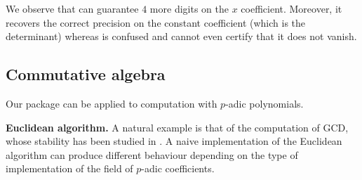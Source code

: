 \documentclass[sigconf]{acmart}
\newcommand{\ZpCR}{\text{\color{output} \rm \tt ZpCR}\xspace}
\newcommand{\ZpLC}{\text{\color{output} \rm \tt ZpLC}\xspace}
\theoremstyle{definition}
\begin{document}
\smallskip

\noindent
We observe that \ZpLC can guarantee $4$ more digits on the $x$ 
coefficient. Moreover, it recovers the correct precision on the
constant coefficient (which is the determinant) whereas \ZpCR is 
confused and cannot even certify that it does not vanish.

\subsection{Commutative algebra}

Our package can be applied to computation with $p$-adic polynomials. 

\medskip

\noindent \textbf{Euclidean algorithm.}
%
A natural example is that of the computation of GCD, whose stability has 
been studied in \cite{caruso:2017}.
A naive implementation of the Euclidean algorithm can produce different 
behaviour depending on the type of implementation of the field of 
$p$-adic coefficients.

\smallskip
\end{document}
